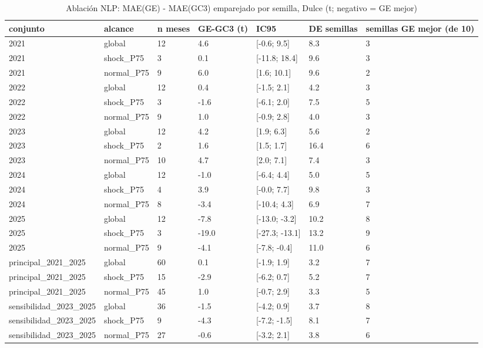 \begin{table}[H]
\centering
\small
\caption{Ablación NLP: MAE(GE) - MAE(GC3) emparejado por semilla, Dulce (t; negativo = GE mejor)}
\label{tab:T11_ablacion_dulce}
\begin{tabular}{lllllll}
\toprule
conjunto & alcance & n meses & GE-GC3 (t) & IC95 & DE semillas & semillas GE mejor (de 10) \\
\midrule
2021 & global & 12 & 4.6 & [-0.6; 9.5] & 8.3 & 3 \\
2021 & shock\_P75 & 3 & 0.1 & [-11.8; 18.4] & 9.6 & 3 \\
2021 & normal\_P75 & 9 & 6.0 & [1.6; 10.1] & 9.6 & 2 \\
2022 & global & 12 & 0.4 & [-1.5; 2.1] & 4.2 & 3 \\
2022 & shock\_P75 & 3 & -1.6 & [-6.1; 2.0] & 7.5 & 5 \\
2022 & normal\_P75 & 9 & 1.0 & [-0.9; 2.8] & 4.0 & 3 \\
2023 & global & 12 & 4.2 & [1.9; 6.3] & 5.6 & 2 \\
2023 & shock\_P75 & 2 & 1.6 & [1.5; 1.7] & 16.4 & 6 \\
2023 & normal\_P75 & 10 & 4.7 & [2.0; 7.1] & 7.4 & 3 \\
2024 & global & 12 & -1.0 & [-6.4; 4.4] & 5.0 & 5 \\
2024 & shock\_P75 & 4 & 3.9 & [-0.0; 7.7] & 9.8 & 3 \\
2024 & normal\_P75 & 8 & -3.4 & [-10.4; 4.3] & 6.9 & 7 \\
2025 & global & 12 & -7.8 & [-13.0; -3.2] & 10.2 & 8 \\
2025 & shock\_P75 & 3 & -19.0 & [-27.3; -13.1] & 13.2 & 9 \\
2025 & normal\_P75 & 9 & -4.1 & [-7.8; -0.4] & 11.0 & 6 \\
principal\_2021\_2025 & global & 60 & 0.1 & [-1.9; 1.9] & 3.2 & 7 \\
principal\_2021\_2025 & shock\_P75 & 15 & -2.9 & [-6.2; 0.7] & 5.2 & 7 \\
principal\_2021\_2025 & normal\_P75 & 45 & 1.0 & [-0.7; 2.9] & 3.3 & 5 \\
sensibilidad\_2023\_2025 & global & 36 & -1.5 & [-4.2; 0.9] & 3.7 & 8 \\
sensibilidad\_2023\_2025 & shock\_P75 & 9 & -4.3 & [-7.2; -1.5] & 8.1 & 7 \\
sensibilidad\_2023\_2025 & normal\_P75 & 27 & -0.6 & [-3.2; 2.1] & 3.8 & 6 \\
\bottomrule
\end{tabular}
\end{table}